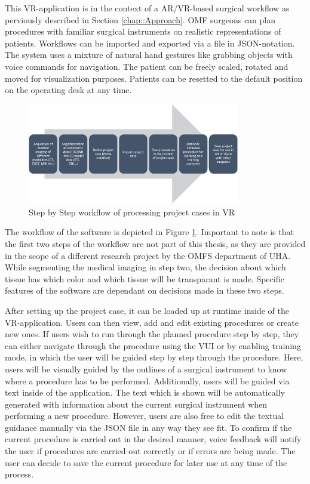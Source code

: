 This VR-application is in the context of a AR/VR-based surgical workflow as perviously described in Section \ref{chap::Approach}.
OMF surgeons can plan procedures with familiar surgical instruments on realistic representations of patients.
Workflows can be imported and exported via a file in JSON-notation.
The system uses a mixture of natural hand gestures like grabbing objects with voice commands for navigation.
The patient can be freely scaled, rotated and moved for visualization purposes.
Patients can be resetted to the default position on the operating desk at any time.

\begin{figure}[ht]
    \centering
    \includegraphics[width=350px]{images/implementation/workflow.png}
    \caption{\label{fig::ImplementationWorkflow}Step by Step workflow of processing project cases in VR}
\end{figure}

The workflow of the software is depicted in Figure \ref{fig::ImplementationWorkflow}.
Important to note is that the first two steps of the workflow are not part of this thesis, as they are provided in the scope of a different research project by the OMFS 
department of UHA.
While segmenting the medical imaging in step two, the decision about which tissue has which color and which tissue will be transparant is made.
Specific features of the software are dependant on decisions made in these two steps.



After setting up the project case, it can be loaded up at runtime inside of the VR-application.
Users can then view, add and edit existing procedures or create new ones.
If users wish to run through the planned procedure step by step, they can either navigate through the procedure using the VUI or by enabling training mode, in which the user will 
be guided step by step through the procedure.
Here, users will be visually guided by the outlines of a surgical instrument to know where a procedure has to be performed.
Additionally, users will be guided via text inside of the application.
The text which is shown will be automatically generated with information about the current surgical instrument when performing a new procedure.
However, users are also free to edit the textual guidance manually via the JSON file in any way they see fit.
To confirm if the current procedure is carried out in the desired manner, voice feedback will notify the user if procedures are carried out correctly or if errors are being made.
The user can decide to save the current procedure for later use at any time of the process.